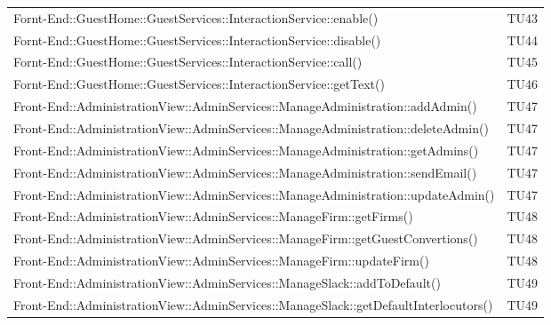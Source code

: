 \documentclass[../PianoDiQualifica.tex]{subfiles}
\begin{document}
\begin{longtable}[c] {>{\centering\arraybackslash}p{9cm} >{\centering\arraybackslash}p{3cm}}
			\addlinespace[0.3em]
			\midrule
			\addlinespace[0.3em]
 			Fornt-End::GuestHome::GuestServices::InteractionService::enable()& TU43 \\
 			\addlinespace[0.3em]
			\midrule
			\addlinespace[0.3em]
 			Fornt-End::GuestHome::GuestServices::InteractionService::disable()& TU44 \\ 
 			\addlinespace[0.3em]
			\midrule
			\addlinespace[0.3em]
			Fornt-End::GuestHome::GuestServices::InteractionService::call()& TU45 \\
			\addlinespace[0.3em]
			\midrule
			\addlinespace[0.3em]
			Fornt-End::GuestHome::GuestServices::InteractionService::getText()& TU46 \\ 
			\addlinespace[0.3em]
			\midrule
			\addlinespace[0.3em]			
 			Front-End::AdministrationView::AdminServices::ManageAdministration::addAdmin()& TU47 \\
 			\addlinespace[0.3em]
			\midrule
			\addlinespace[0.3em] 
 			Front-End::AdministrationView::AdminServices::ManageAdministration::deleteAdmin()& TU47 \\ 
 			\addlinespace[0.3em]
			\midrule
			\addlinespace[0.3em]
 			Front-End::AdministrationView::AdminServices::ManageAdministration::getAdmins()& TU47 \\ 
 			\addlinespace[0.3em]
			\midrule
			\addlinespace[0.3em]
 			Front-End::AdministrationView::AdminServices::ManageAdministration::sendEmail()& TU47 \\
 			\addlinespace[0.3em]
			\midrule
			\addlinespace[0.3em] 
 			Front-End::AdministrationView::AdminServices::ManageAdministration::updateAdmin()& TU47 \\
 			\addlinespace[0.3em]
			\midrule
			\addlinespace[0.3em] 
 			Front-End::AdministrationView::AdminServices::ManageFirm::getFirms()& TU48 \\ 
 			\addlinespace[0.3em]
			\midrule
			\addlinespace[0.3em]
 			Front-End::AdministrationView::AdminServices::ManageFirm::getGuestConvertions()& TU48 \\ 
 			\addlinespace[0.3em]
			\midrule
			\addlinespace[0.3em]
 			Front-End::AdministrationView::AdminServices::ManageFirm::updateFirm()& TU48 \\ 
 			\addlinespace[0.3em]
			\midrule
			\addlinespace[0.3em]
 			Front-End::AdministrationView::AdminServices::ManageSlack::addToDefault()& TU49 \\ 
 			\addlinespace[0.3em]
			\midrule
			\addlinespace[0.3em]
			Front-End::AdministrationView::AdminServices::ManageSlack::getDefaultInterlocutors()& TU49 \\

\end{longtable}
\end{document}
